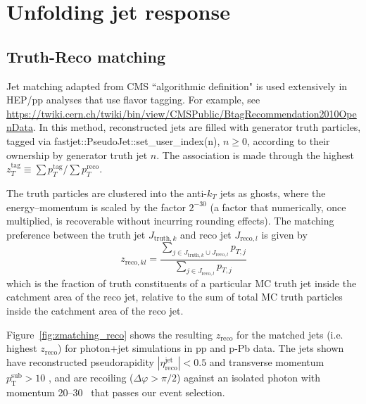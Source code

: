 
\section{Unfolding jet response}
\label{sec:jetunfolding}
\subsection{Truth-Reco matching}
Jet matching adapted from CMS ``algorithmic definition" is used extensively in HEP/pp analyses that use flavor tagging. For example, see \url{https://twiki.cern.ch/twiki/bin/view/CMSPublic/BtagRecommendation2010OpenData}. In this method, reconstructed jets are filled with generator truth particles, tagged via fastjet::PseudoJet::set\_user\_index(n), $n \geq 0$, according to their ownership by generator truth jet $n$. The association is made through the highest {$z_{T}^{\mathrm{tag}}\equiv\sum p_{T}^{\mathrm{tag}}/ \sum p_{T}^{\mathrm{reco}}$}. 

The truth particles are clustered into the anti-$k_T$ jets as ghosts,
where the energy--momentum is scaled by the factor $2^{-30}$ (a factor
that numerically, once multiplied, is recoverable without incurring
rounding effects). The matching preference between the truth jet
$J_{\mathrm{truth},k}$ and reco jet $J_{\mathrm{reco},l}$ is given by
\begin{equation}
  z_{\mathrm{reco},kl} = \frac{\sum_{j \in J_{\mathrm{truth},k} \cup
      J_{\mathrm{reco},l}} p_{T,j}}{\sum_{j \in J_{\mathrm{reco},l}}
    p_{T,j}}
\end{equation}
which is the fraction of truth constituents of a particular MC truth
jet inside the catchment area of the reco jet, relative to the sum of
total MC truth particles inside the catchment area of the reco jet.

Figure~\ref{fig:zmatching_reco} shows the resulting $z_{\mathrm{reco}}$ for the matched jets (i.e. highest $z_{\mathrm{reco}}$) for photon+jet simulations in pp and p-Pb data. The jets shown have reconstructed pseudorapidity $|\eta^{\mathrm{jet}}_{\mathrm{reco}}|<0.5$ and transverse momentum $p_{\mathrm{T}}^{\mathrm{sub}}> 10$ \GeVc, and are recoiling ($\Delta\varphi > \pi/2$) against an isolated photon with momentum 20--30 \GeVc~that passes our event selection. 

